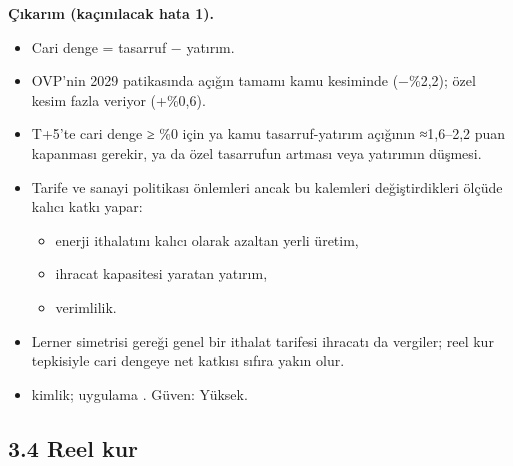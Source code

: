 \textbf{Çıkarım (kaçınılacak hata 1).}

\begin{itemize}
\tightlist
\item
  Cari denge = tasarruf − yatırım.
\item
  OVP'nin 2029 patikasında açığın tamamı kamu kesiminde (−\%2,2); özel kesim fazla veriyor (+\%0,6).
\item
  T+5'te cari denge ≥ \%0 için ya kamu tasarruf-yatırım açığının ≈1,6--2,2 puan kapanması gerekir, ya da özel tasarrufun artması veya yatırımın düşmesi.
\item
  Tarife ve sanayi politikası önlemleri ancak bu kalemleri değiştirdikleri ölçüde kalıcı katkı yapar:

  \begin{itemize}
  \tightlist
  \item
    enerji ithalatını kalıcı olarak azaltan yerli üretim,
  \item
    ihracat kapasitesi yaratan yatırım,
  \item
    verimlilik.
  \end{itemize}
\item
  Lerner simetrisi gereği genel bir ithalat tarifesi ihracatı da vergiler; reel kur tepkisiyle cari dengeye net katkısı sıfıra yakın olur.
\item
  \etiketV{} kimlik; uygulama \etiketH{}. Güven: Yüksek.
\end{itemize}

\hypertarget{01_teshis-34-reel-kur}{%
\subsection{3.4 Reel kur}\label{01_teshis-34-reel-kur}}

